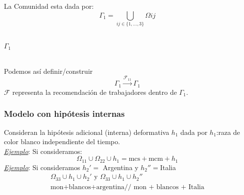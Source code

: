 \documentclass[]{article}
\begin{document}
La Comunidad  esta dada por:
\begin{equation*}
\Gamma_1=\bigcup_{ij\in\{1,\dots,3\}} \Omega{ij}
\end{equation*}
\\
\begin{center}
$\Gamma_1$\\
\\
\end{center}
Podemos as\'i definir/construir\\
\begin{equation}
\Gamma_1 \xrightarrow{\mathcal{F}_{11}} \Gamma_1
\end{equation}
$\mathcal{F}$ representa la recomendaci\'on de trabajadores dentro de $\Gamma_1.$
\subsubsection{Modelo con hip\'otesis internas}
Consideran la hip\'otesis adicional (interna) deformativa $h_1$ dada por $h_1$:raza de color blanco independiente del tiempo.\\
\emph{\underline{Ejemplo}}: Si consideramos: 
\begin{equation*}
\Omega_{11}\cup \Omega_{22} \cup h_1 = \text{mcs} + \text{mcm} + h_1
\end{equation*}
\emph{\underline{Ejemplo}}: Si consideramos $h_2'=$ Argentina y $h_2''=$Italia
\begin{eqnarray*}
\Omega_{33}\cup h_1\cup h_2' \text{  y  } \Omega_{33}\cup h_1 \cup h_2''\\
\text{mon+blancos+argentina// mon + blancos + Italia}   
\end{eqnarray*}
\hrulefill\\
\end{document}
